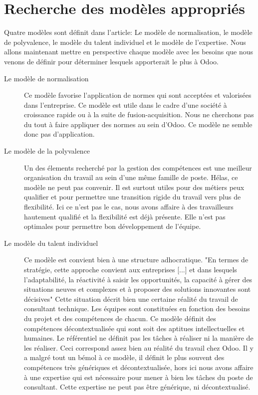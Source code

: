 \section{Recherche des modèles appropriés}
Quatre modèles sont définit dans l'article\citep[pp.39-49]{delobbe}: Le modèle de normalisation, le modèle de polyvalence, le modèle du talent individuel et le modèle de l'expertise. Nous allons maintenant mettre en perspective chaque modèle avec les besoins que nous venons de définir pour déterminer lesquels apporterait le plus à Odoo.
\begin{description}
  \item[Le modèle de normalisation]
  Ce modèle favorise l'application de normes qui sont acceptées et valorisées dans l'entreprise. Ce modèle est utile dans le cadre d'une société à croissance rapide ou à la suite de fusion-acquisition. Nous ne cherchons pas du tout à faire appliquer des normes au sein d'Odoo. Ce modèle ne semble donc pas d'application. 
  \item[Le modèle de la polyvalence]
  Un des élements recherché par la gestion des compétences est une meilleur organisation du travail au sein d'une même famille de poste. Hélas, ce modèle ne peut pas convenir. Il est surtout utiles pour des métiers peux qualifier et pour permettre une transition rigide du travail vers plus de flexibilité. Ici ce n'est pas le cas, nous avons affaire à des travailleurs hautement qualifié et la flexibilité est déjà présente. Elle n'est pas optimales pour permettre bon développement de l'équipe. 
  \item[Le modèle du talent individuel]
  Ce modèle est convient bien à une structure adhocratique. "En termes de stratégie, cette approche convient aux entreprises [...] et dans lesquels l'adaptabilité, la réactivité à saisir les opportunités, la capacité à gérer des situations neuves et complexes et à proposer des solutions innovantes sont décisives"\citep[pp.44]{delobbe} Cette situation décrit bien une certaine réalité du travail de consultant technique. Les équipes sont constituées en fonction des besoins du projet et des compétences de chacun. Ce modèle définit des compétences décontextualisée qui sont soit des aptitues intellectuelles et humaines. Le référentiel ne définit pas les tâches à réaliser ni la manière de les réaliser. Ceci correspond assez bien au réalité du travail chez Odoo. Il y a malgré tout un bémol à ce modèle, il définit le plus souvent des compétences très génériques et décontextualisée, hors ici nous avons affaire à une expertise qui est nécessaire pour mener à bien les tâches du poste de consultant. Cette expertise ne peut pas être générique, ni décontextualisé. 

\end{description}
